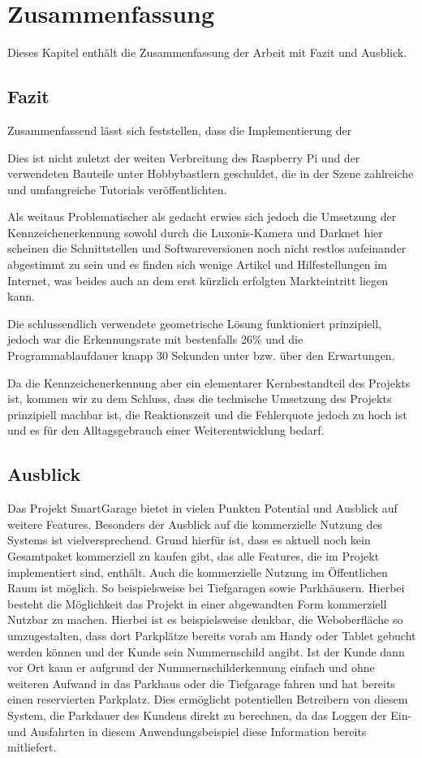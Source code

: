 \chapter{Zusammenfassung}

\nocite{*}

Dieses Kapitel enthält die Zusammenfassung der Arbeit mit Fazit und Ausblick.

\section{Fazit}
Zusammenfassend lässt sich feststellen, dass die Implementierung der 

Dies ist nicht zuletzt der weiten Verbreitung des Raspberry Pi und der verwendeten Bauteile unter Hobbybastlern geschuldet, die in der Szene zahlreiche und umfangreiche Tutorials veröffentlichten.

Als weitaus Problematischer als gedacht erwies sich jedoch die Umsetzung der Kennzeichenerkennung sowohl durch die Luxonis-Kamera und Darknet hier scheinen die Schnittstellen und Softwareversionen noch nicht restlos aufeinander abgestimmt zu sein und es finden sich wenige Artikel und Hilfestellungen im Internet, was beides auch an dem erst kürzlich erfolgten Markteintritt liegen kann.

Die schlussendlich verwendete geometrische Lösung funktioniert prinzipiell, jedoch war die Erkennungsrate mit bestenfalls 26\% und die Programmablaufdauer knapp 30 Sekunden unter bzw. über den Erwartungen. 

Da die Kennzeichenerkennung aber ein elementarer Kernbestandteil des Projekts ist, kommen wir zu dem Schluss, dass die technische Umsetzung des Projekts prinzipiell machbar ist, die Reaktionszeit und die Fehlerquote jedoch zu hoch ist und es für den Alltagsgebrauch einer Weiterentwicklung bedarf.

\section{Ausblick}
Das Projekt SmartGarage bietet in vielen Punkten Potential und Ausblick auf weitere Features. Besonders der Ausblick auf die kommerzielle Nutzung des Systems ist vielversprechend. Grund hierfür ist, dass es aktuell noch kein Gesamtpaket kommerziell zu kaufen gibt, das alle Features, die im Projekt implementiert sind, enthält. Auch die kommerzielle Nutzung im Öffentlichen Raum ist möglich. So beispielsweise bei Tiefgaragen sowie Parkhäusern. Hierbei besteht die Möglichkeit das Projekt in einer abgewandten Form kommerziell Nutzbar zu machen. Hierbei ist es beispielsweise denkbar, die Weboberfläche so umzugestalten, dass dort Parkplätze bereits vorab am Handy oder Tablet gebucht werden können und der Kunde sein Nummernschild angibt. Ist der Kunde dann vor Ort kann er aufgrund der Nummernschilderkennung einfach und ohne weiteren Aufwand in das Parkhaus oder die Tiefgarage fahren und hat bereits einen reservierten Parkplatz. Dies ermöglicht potentiellen Betreibern von diesem System, die Parkdauer des Kundens direkt zu berechnen, da das Loggen der Ein- und Ausfahrten in diesem Anwendungsbeispiel diese Information bereits mitliefert. 

